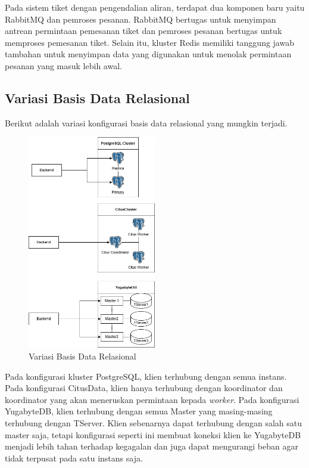 Pada sistem tiket dengan pengendalian aliran, terdapat dua komponen baru yaitu RabbitMQ dan pemroses pesanan. RabbitMQ bertugas untuk menyimpan antrean permintaan pemesanan tiket dan pemroses pesanan bertugas untuk memproses pemesanan tiket. Selain itu, kluster Redis memiliki tanggung jawab tambahan untuk menyimpan data yang digunakan untuk menolak permintaan pesanan yang masuk lebih awal.

\pagebreak

\subsection{Variasi Basis Data Relasional}

Berikut adalah variasi konfigurasi basis data relasional yang mungkin terjadi.

\begin{figure}[htbp]
    \centering
    \includegraphics[width=0.5\textwidth]{resources/chapter-3/rdbms.png}
    \caption{Variasi Basis Data Relasional}
    \label{fig:rdbms-variation}
\end{figure}

Pada konfigurasi kluster PostgreSQL, klien terhubung dengan semua instans. Pada konfigurasi CitusData, klien hanya terhubung dengan koordinator dan koordinator yang akan meneruskan permintaan kepada \textit{worker}. Pada konfigurasi YugabyteDB, klien terhubung dengan semua Master yang masing-masing terhubung dengan TServer. Klien sebenarnya dapat terhubung dengan salah satu master saja, tetapi konfigurasi seperti ini membuat koneksi klien ke YugabyteDB menjadi lebih tahan terhadap kegagalan dan juga dapat mengurangi beban agar tidak terpusat pada satu instans saja.

